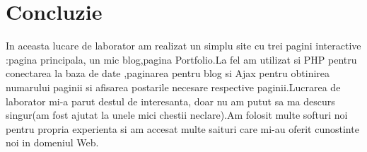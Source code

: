 \section*{Concluzie}
In aceasta lucare de laborator am realizat un simplu site cu trei pagini interactive :pagina principala, un mic blog,pagina Portfolio.La fel am utilizat si PHP pentru conectarea la baza de date ,paginarea pentru blog si Ajax pentru obtinirea numarului paginii si afisarea postarile necesare respective paginii.Lucrarea de laborator mi-a parut destul de interesanta, doar nu am putut sa ma descurs singur(am fost ajutat la unele mici chestii neclare).Am folosit multe softuri noi pentru propria experienta si am accesat multe saituri care mi-au oferit cunostinte noi in domeniul Web.

\clearpage